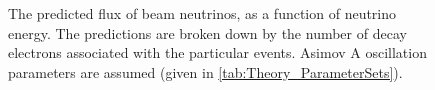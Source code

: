 \begin{figure}[h]
\begin{subfigure}[t]{0.49\textwidth}
  \end{subfigure}
  \caption{The predicted flux of beam neutrinos, as a function of neutrino energy. The predictions are broken down by the number of decay electrons associated with the particular events. Asimov A oscillation parameters are assumed (given in \autoref{tab:Theory_ParameterSets}).}
  \label{fig:Simulations_NeutrinoEnergyDistribution_T2K}
\end{figure}
